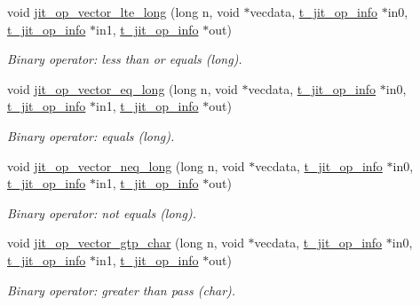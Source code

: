 \begin{DoxyCompactItemize}
void \hyperlink{group__opvecmod_ga50c14b50b918b96fc426e73781c365a4}{jit\_\-op\_\-vector\_\-lte\_\-long} (long n, void $\ast$vecdata, \hyperlink{structt__jit__op__info}{t\_\-jit\_\-op\_\-info} $\ast$in0, \hyperlink{structt__jit__op__info}{t\_\-jit\_\-op\_\-info} $\ast$in1, \hyperlink{structt__jit__op__info}{t\_\-jit\_\-op\_\-info} $\ast$out)
\begin{DoxyCompactList}\small\item\em Binary operator: less than or equals (long). \item\end{DoxyCompactList}\item 
void \hyperlink{group__opvecmod_ga86f24545ec76bb050b4272e9e95f3574}{jit\_\-op\_\-vector\_\-eq\_\-long} (long n, void $\ast$vecdata, \hyperlink{structt__jit__op__info}{t\_\-jit\_\-op\_\-info} $\ast$in0, \hyperlink{structt__jit__op__info}{t\_\-jit\_\-op\_\-info} $\ast$in1, \hyperlink{structt__jit__op__info}{t\_\-jit\_\-op\_\-info} $\ast$out)
\begin{DoxyCompactList}\small\item\em Binary operator: equals (long). \item\end{DoxyCompactList}\item 
void \hyperlink{group__opvecmod_gaa3a4995b1eda5ef6f7576c458215d56f}{jit\_\-op\_\-vector\_\-neq\_\-long} (long n, void $\ast$vecdata, \hyperlink{structt__jit__op__info}{t\_\-jit\_\-op\_\-info} $\ast$in0, \hyperlink{structt__jit__op__info}{t\_\-jit\_\-op\_\-info} $\ast$in1, \hyperlink{structt__jit__op__info}{t\_\-jit\_\-op\_\-info} $\ast$out)
\begin{DoxyCompactList}\small\item\em Binary operator: not equals (long). \item\end{DoxyCompactList}\item 
void \hyperlink{group__opvecmod_ga7ecdd3b9dfb769c315b26123622f058c}{jit\_\-op\_\-vector\_\-gtp\_\-char} (long n, void $\ast$vecdata, \hyperlink{structt__jit__op__info}{t\_\-jit\_\-op\_\-info} $\ast$in0, \hyperlink{structt__jit__op__info}{t\_\-jit\_\-op\_\-info} $\ast$in1, \hyperlink{structt__jit__op__info}{t\_\-jit\_\-op\_\-info} $\ast$out)
\begin{DoxyCompactList}\small\item\em Binary operator: greater than pass (char). \item\end{DoxyCompactList}\item 

\end{DoxyCompactItemize}
